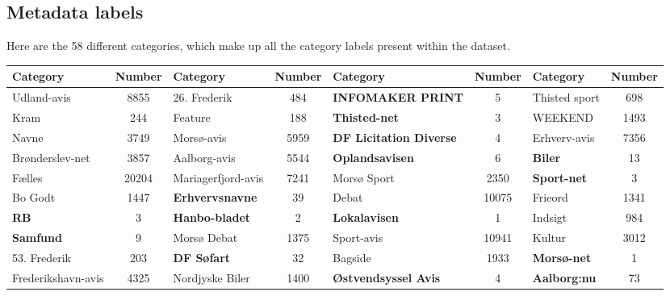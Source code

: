 \subsection{Metadata labels}\label{sec:appendix_meta_data}
Here are the 58 different categories, which make up all the category labels present within the dataset.

\begin{table*}[h]
	\centering
	\begin{tabular}{l|c|l|c|l|c|l|c}
		Category                   & Number & Category                & Number & Category                       & Number & Category                       & Number \\ \toprule
		Udland-avis                &  8855  & 26. Frederik            &  484   & \textbf{INFOMAKER PRINT}       &   5    & Thisted sport                  &  698   \\
		Kram                       &  244   & Feature                 &  188   & \textbf{Thisted-net}           &   3    & WEEKEND                        &  1493  \\
		Navne                      &  3749  & Morsø-avis              &  5959  & \textbf{DF Licitation Diverse} &   4    & Erhverv-avis                   &  7356  \\
		Brønderslev-net            &  3857  & Aalborg-avis            &  5544  & \textbf{Oplandsavisen}         &   6    & \textbf{Biler}                 &   13   \\
		Fælles                     & 20204  & Mariagerfjord-avis      &  7241  & Morsø Sport                    &  2350  & \textbf{Sport-net}             &   3    \\
		Bo Godt                    &  1447  & \textbf{Erhvervsnavne}  &   39   & Debat                          & 10075  & Frieord                        &  1341  \\
		\textbf{RB}                &   3    & \textbf{Hanbo-bladet}   &   2    & \textbf{Lokalavisen}           &   1    & Indsigt                        &  984   \\
		\textbf{Samfund}           &   9    & Morsø Debat             &  1375  & Sport-avis                     & 10941  & Kultur                         &  3012  \\
		53. Frederik               &  203   & \textbf{DF Søfart}      &   32   & Bagside                        &  1933  & \textbf{Morsø-net}             &   1    \\
		Frederikshavn-avis         &  4325  & Nordjyske Biler         &  1400  & \textbf{Østvendsyssel Avis}    &   4    & \textbf{Aalborg:nu}            &   73   \\

\end{tabular}
\end{table*}

